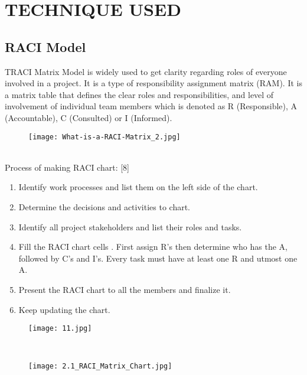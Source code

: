 \documentclass[a4paper,12pt]{article}
\begin{document}
\section {TECHNIQUE USED}

\subsection{RACI Model}
TRACI Matrix Model is widely used to get clarity regarding roles of everyone involved in a project. It is a type of responsibility assignment matrix (RAM). It is a matrix table that defines the clear roles and responsibilities, and level of involvement of individual team members which is denoted as R (Responsible), A (Accountable), C (Consulted) or I (Informed).


\begin{figure}[h!]
      \raggedleft
      \texttt{[image: What-is-a-RACI-Matrix\_2.jpg]} 
    \end{figure}
\\
Process of making RACI chart:
[8]
\begin{enumerate}
\item Identify work processes and list them on the left side of the chart.
\item Determine the decisions and activities to chart.
\item Identify all project stakeholders and list their roles and tasks.
\item Fill the RACI chart cells . First assign R’s then determine who has the A, followed by C’s and I’s. Every task must have at least one R and utmost one A.
\item Present the RACI chart to all the members and finalize it.
\item Keep updating the chart.
\end{enumerate}





\begin{figure}[h!]
      \raggedleft
      \texttt{[image: 11.jpg]} 
    \end{figure}
\\


\begin{figure}[h!]
      \raggedleft
      \texttt{[image: 2.1\_RACI\_Matrix\_Chart.jpg]} 
    \end{figure}
\\
\end{document}
